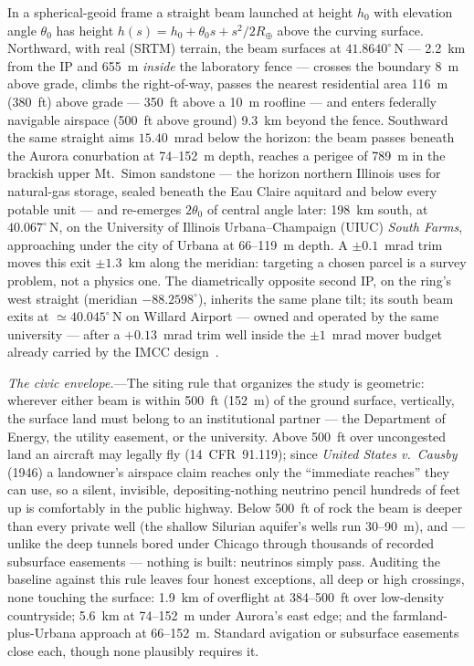 \documentclass[aps,prl,reprint,superscriptaddress,nofootinbib]{revtex4-2}
\begin{document}
In a spherical-geoid frame a straight beam launched at height $h_0$ with
elevation angle $\theta_0$ has height
$h(s)=h_0+\theta_0 s+s^{2}/2R_\oplus$ above the curving surface. Northward,
with real (SRTM) terrain, the beam surfaces at $41.8640^\circ$\,N ---
2.2~km from the IP and 655~m \emph{inside} the laboratory fence --- crosses
the boundary 8~m above grade, climbs the right-of-way, passes the nearest
residential area 116~m (380~ft) above grade --- 350~ft above a 10~m
roofline --- and enters federally navigable airspace (500~ft above ground)
9.3~km beyond the fence.
Southward the same straight aims $15.40$~mrad below the horizon: the beam
passes beneath the Aurora conurbation at 74--152~m depth, reaches a
perigee of 789~m in the brackish upper Mt.~Simon sandstone --- the horizon
northern Illinois uses for natural-gas storage, sealed beneath the Eau
Claire aquitard and below every potable unit --- and re-emerges
$2\theta_0$ of central angle later: 198~km south, at $40.067^\circ$\,N,
on the University of Illinois Urbana--Champaign (UIUC) \emph{South Farms},
approaching under the city of Urbana at 66--119~m depth. A
$\pm0.1$~mrad trim moves this exit $\pm1.3$~km along the meridian:
targeting a chosen parcel is a survey problem, not a physics one. The
diametrically opposite second IP, on the ring's west straight (meridian
$-88.2598^\circ$), inherits the same plane tilt; its south beam exits at
${\simeq}40.045^\circ$\,N on Willard Airport --- owned and operated by the
same university --- after a $+0.13$~mrad trim well inside the
$\pm1$~mrad mover budget already carried by the IMCC design~\cite{IMCC}.

\emph{The civic envelope.}---The siting rule that organizes the study is
geometric: wherever either beam is within 500~ft (152~m) of the ground
surface, vertically, the surface land must belong to an institutional
partner --- the Department of Energy, the utility easement, or the
university. Above 500~ft over uncongested land an aircraft may legally
fly (14~CFR~91.119); since \emph{United States v.\ Causby} (1946) a
landowner's airspace claim reaches only the ``immediate reaches'' they
can use, so a silent, invisible, depositing-nothing neutrino pencil
hundreds of feet up is comfortably in the public highway. Below 500~ft of
rock the beam is deeper than every private well (the shallow Silurian
aquifer's wells run 30--90~m), and --- unlike the deep tunnels bored
under Chicago through thousands of recorded subsurface
easements --- nothing is built: neutrinos simply pass. Auditing the
baseline against this rule leaves four honest exceptions, all deep or
high crossings, none touching the surface: 1.9~km of overflight at
384--500~ft over low-density countryside; 5.6~km at 74--152~m under
Aurora's east edge; and the farmland-plus-Urbana approach at 66--152~m.
Standard avigation or subsurface easements close each, though none
plausibly requires it.
\end{document}
